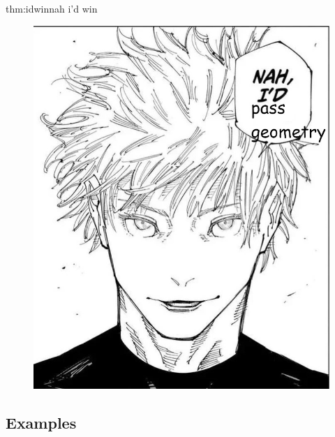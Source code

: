 \documentclass[landscape, 8pt]{extarticle}
\begin{document}
\begin{multicols}{3}
\begin{thm}{thm:idwin}{nah i'd win}
    \begin{figure}[H]
        \centering
        \includegraphics[width=\linewidth]{images/nah_id_win.jpg}
    \end{figure}
\end{thm}

\newpage 

\subsection*{Examples}


\end{multicols}
\end{document}
